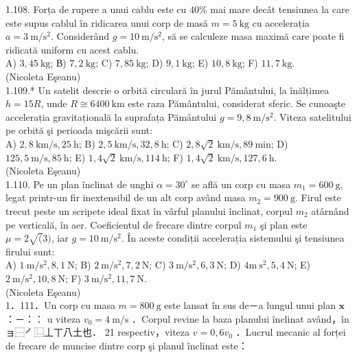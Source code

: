 \documentclass[10pt]{article}
\begin{document}
1.108. Forța de rupere a unui cablu este cu $40 \%$ mai mare decât tensiunea la care este supus cablul în ridicarea unui corp de masă $m=5 \mathrm{~kg}$ cu accelerația $a=3 \mathrm{~m} / \mathrm{s}^{2}$. Considerând $g=10 \mathrm{~m} / \mathrm{s}^{2}$, să se calculeze masa maximă care poate fi ridicată uniform cu acest cablu.\\ A) $3,45 \mathrm{~kg}$; В) $7,2 \mathrm{~kg}$; C) $7,85 \mathrm{~kg}$; D) $9,1 \mathrm{~kg}$; E) $10,8 \mathrm{~kg}$; F) $11,7 \mathrm{~kg}$.\\ (Nicoleta Eşeanu)\\

1.109.* Un satelit descrie o orbită circulară în jurul Pământului, la înălțimea $h=15 R$, unde $R \cong 6400 \mathrm{~km}$ este raza Pământului, considerat sferic. Se cunoaşte accelerația gravitațională la suprafața Pământului $g=9,8 \mathrm{~m} / \mathrm{s}^{2}$. Viteza satelitului pe orbită şi perioada mişcării sunt:\\ A) $2,8 \mathrm{~km} / \mathrm{s}, 25 \mathrm{~h}$; B) $2,5 \mathrm{~km} / \mathrm{s}, 32,8 \mathrm{~h}$; C) $2,8 \sqrt{2} \mathrm{~km} / \mathrm{s}, 89 \mathrm{~min}$; D) $125,5 \mathrm{~m} / \mathrm{s}, 85 \mathrm{~h}$; E) $1,4 \sqrt{2} \mathrm{~km} / \mathrm{s}, 114 \mathrm{~h}$; F) $1,4 \sqrt{2} \mathrm{~km} / \mathrm{s}, 127,6 \mathrm{~h}$.\\ (Nicoleta Eşeanu)\\

1.110. Pe un plan înclinat de unghi $\alpha=30^{\circ}$ se află un corp cu masa $m_{1}=600 \mathrm{~g}$, legat printr-un fir inextensibil de un alt corp având masa $m_{2}=900 \mathrm{~g}$. Firul este trecut peste un scripete ideal fixat în vârful planului înclinat, corpul $m_{2}$ atârnând pe verticală, în aer. Coeficientul de frecare dintre corpul $m_{1}$ şi plan este $\mu=2 \sqrt(3)$, iar $g=10 \mathrm{~m} / \mathrm{s}^{2}$. În aceste condiții accelerația sistemului şi tensiunea firului sunt:\\ A) $1 \mathrm{~m} / \mathrm{s}^{2}, 8,1 \mathrm{~N}$; B) $2 \mathrm{~m} / \mathrm{s}^{2}, 7,2 \mathrm{~N}$; C) $3 \mathrm{~m} / \mathrm{s}^{2}, 6,3 \mathrm{~N}$; D) $4 \mathrm{m} \mathrm{~s}^{2}, 5,4 \mathrm{~N}$; E) $2 \mathrm{~m} / \mathrm{s}^{2}, 10,8 \mathrm{~N}$; F) $3 \mathrm{~m} / \mathrm{s}^{2}, 11,7 \mathrm{~N}$. \\ (Nicoleta Eşeanu)\\

1．111．Un corp cu masa $m=800 \mathrm{~g}$ este lansat în sus de－a lungul unui plan $\mathbf{x}$ ：－：： u viteza $v_{0}=4 \mathrm{~m} / \mathrm{s}$ ．Corpul revine la baza planului înclinat având，în ョ⿱㇒⿺丄丅八土也． 21 respectiv，viteza $v=0,6 v_{0}$ ．Lucrul mecanic al forței de frecare de muncise dintre corp şi planul înclinat este：
\end{document}
